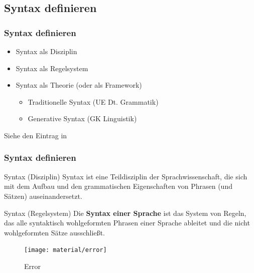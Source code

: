 \subsection{Syntax definieren}


\begin{frame}
\frametitle{Syntax definieren}

\begin{itemize}
	\item Syntax als Disziplin
	\item Syntax als Regelsystem
	\item Syntax als Theorie (oder als Framework)
	\begin{itemize}
		\item Traditionelle Syntax (\ras UE Dt. Grammatik)
		\item Generative Syntax (\ras GK Linguistik)
	\end{itemize}
\end{itemize}

Siehe den Eintrag  in \citet{Glueck&Roedel16a}

\end{frame}


\begin{frame}
\frametitle{Syntax definieren}

\begin{block}{Syntax (Disziplin)}
Syntax ist eine Teildisziplin der Sprachwissenschaft, die sich mit dem Aufbau und den grammatischen Eigenschaften von Phrasen (und Sätzen) auseinandersetzt.
\end{block}

\begin{block}{Syntax (Regelsystem)}
Die \textbf{Syntax einer Sprache} ist das System von Regeln, das alle syntaktisch wohlgeformten Phrasen einer Sprache ableitet und die nicht wohlgeformten Sätze ausschließt.
\end{block}

\end{frame}


\begin{frame}

\begin{figure}
\centering
	\texttt{[image: material/error]}
	\caption{Error}\label{Abb1}
\end{figure}

\end{frame}


